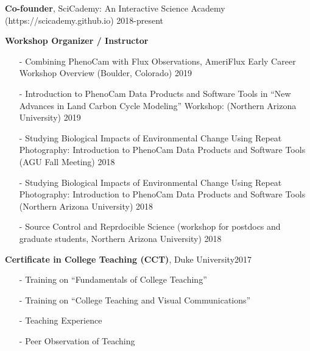 \documentclass[10pt]{article}
\newenvironment{changemargin}[2]{%
  \begin{list}{}{%
 \setlength{\topsep}{0pt}%
 \setlength{\leftmargin}{#1}%
 \setlength{\rightmargin}{#2}%
 \setlength{\listparindent}{\parindent}%
 \setlength{\itemindent}{\parindent}%
 \setlength{\parsep}{\parskip}%
  }%
  \item[]}{\end{list}
}
\newenvironment{body} {
  \vspace*{-2pt}
  \begin{changemargin}{-0.5in}{-0.5in}
}
{\end{changemargin}
}
\begin{document}
\begin{body}

  \textbf{Co-founder}, SciCademy: An Interactive Science Academy (https://scicademy.github.io) \hfill {2018-present}\\
  \medskip

  \textbf {Workshop Organizer / Instructor}\\
  \vspace*{-4pt}
  \begin{itemize} \itemsep -0pt
  
    \item[-] Combining PhenoCam with Flux Observations, AmeriFlux Early Career Workshop Overview (Boulder, Colorado)  \hfill {2019} \smallskip

    \item[-] Introduction to PhenoCam Data Products and Software Tools in ``New Advances in Land Carbon Cycle Modeling'' Workshop:  (Northern Arizona University)  \hfill {2019} \smallskip
    
    \item[-] Studying Biological Impacts of Environmental Change Using Repeat Photography: Introduction to PhenoCam Data Products and Software Tools (AGU Fall Meeting)  \hfill {2018}\smallskip
    \item[-] Studying Biological Impacts of Environmental Change Using Repeat Photography: Introduction to PhenoCam Data Products and Software Tools (Northern Arizona University)  \hfill {2018}\smallskip
    \item[-] Source Control and Reprdocible Science (workshop for postdocs and graduate students, Northern Arizona University)  \hfill {2018}\smallskip
  \end{itemize}
  \medskip

  \textbf{Certificate in College Teaching (CCT)}, Duke University\hfill {2017}\\
  \vspace*{-4pt}
  \begin{itemize} \itemsep -0pt
    \item[-]Training on ``Fundamentals of College Teaching''\\
    \item[-]Training on ``College Teaching and Visual Communications''\\
    \item[-]Teaching Experience
    \item[-]Peer Observation of Teaching \\
  \end{itemize}
  \medskip



\end{body}
\end{document}
